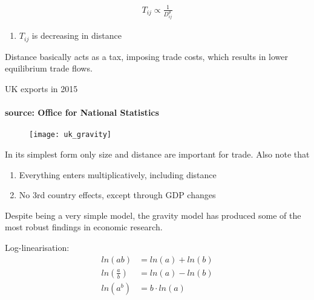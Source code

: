 \documentclass{beamer}
\begin{document}
\begin{frame}
  \begin{align*}
    T_{ij} \propto \frac{1}{D_{ij}^{\theta}}
  \end{align*}

\begin{enumerate}
  \item $T_{ij}$ is decreasing in distance
\end{enumerate}
Distance basically acts as a tax, imposing trade costs, which results in lower equilibrium trade flows.
\end{frame}

\begin{frame}{UK exports in 2015}
\framesubtitle{source: Office for National Statistics}
  \begin{figure}
    \texttt{[image: uk\_gravity]}
  \end{figure}  
\end{frame}

\begin{frame}
  In its simplest form only size and distance are important for trade. 
  \medskip
  Also note that 
  \begin{enumerate}
    \item Everything enters multiplicatively, including distance
    \item No 3rd country effects, except through GDP changes
  \end{enumerate}
  \medskip
  Despite being a very simple model, the gravity model has produced some of the most robust findings in economic research.
\end{frame}

\begin{frame}
  Log-linearisation:
  \begin{align*}
    ln(ab) &= ln(a)+ln(b)\\ 
    ln \left(\frac{a}{b} \right) &= ln(a) - ln(b)\\
    ln(a^b) &= b \cdot ln(a)
  \end{align*}
\end{frame}
\end{document}
